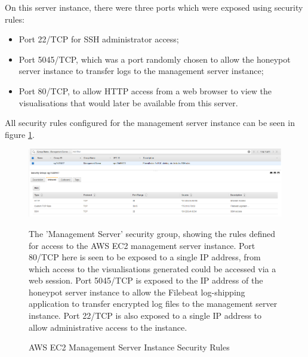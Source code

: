 On this server instance, there were three ports which were exposed using security rules:
	\begin{itemize}
    	\item Port 22/TCP for SSH administrator access;
        \item Port 5045/TCP, which was a port randomly chosen to allow the honeypot server instance to transfer logs to the management server instance;
        \item Port 80/TCP, to allow HTTP access from a web browser to view the visualisations that would later be available from this server.
	\end{itemize}
    
 All security rules configured for the management server instance can be seen in figure \ref{fig:ManagementInstanceSecurityRules}.

 \begin{figure}[ht]
      \centering
      \includegraphics[width=160mm, scale=1]{Images/AWS_management_instance_security_group_rules.PNG}
      \caption{AWS EC2 Management Server Instance Security Rules} 
      \medskip
      \small
		The 'Management Server' security group, showing the rules defined for access to the AWS EC2 management server instance. Port 80/TCP here is seen to be exposed to a single IP address, from which access to the visualisations generated could be accessed via a web session. Port 5045/TCP is exposed to the IP address of the honeypot server instance to allow the Filebeat log-shipping application to transfer encrypted log files to the management server instance. Port 22/TCP is also exposed to a single IP address to allow administrative access to the instance.
\label{fig:ManagementInstanceSecurityRules}
\end{figure}





